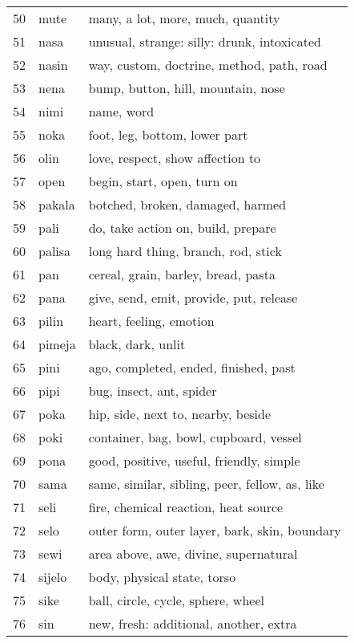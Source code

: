\documentclass[11pt]{article}
\begin{document}
{\begin{multicols}{2}[]
\columnbreak
\begin{center}
\begin{tabularx}{\linewidth}{rlX}
50 & mute & many, a lot, more, much, quantity\\[0pt]
51 & nasa & unusual, strange: silly: drunk, intoxicated\\[0pt]
52 & nasin & way, custom, doctrine, method, path, road\\[0pt]
53 & nena & bump, button, hill, mountain, nose\\[0pt]
54 & nimi & name, word\\[0pt]
55 & noka & foot, leg, bottom, lower part\\[0pt]
56 & olin & love, respect, show affection to\\[0pt]
57 & open & begin, start, open, turn on\\[0pt]
58 & pakala & botched, broken, damaged, harmed\\[0pt]
59 & pali & do, take action on, build, prepare\\[0pt]
60 & palisa & long hard thing, branch, rod, stick\\[0pt]
61 & pan & cereal, grain, barley, bread, pasta\\[0pt]
62 & pana & give, send, emit, provide, put, release\\[0pt]
63 & pilin & heart, feeling, emotion\\[0pt]
64 & pimeja & black, dark, unlit\\[0pt]
65 & pini & ago, completed, ended, finished, past\\[0pt]
66 & pipi & bug, insect, ant, spider\\[0pt]
67 & poka & hip, side, next to, nearby, beside\\[0pt]
68 & poki & container, bag, bowl, cupboard, vessel\\[0pt]
69 & pona & good, positive, useful, friendly, simple\\[0pt]
70 & sama & same, similar, sibling, peer, fellow, as, like\\[0pt]
71 & seli & fire, chemical reaction, heat source\\[0pt]
72 & selo & outer form, outer layer, bark, skin, boundary\\[0pt]
73 & sewi & area above, awe, divine, supernatural\\[0pt]
74 & sijelo & body, physical state, torso\\[0pt]
75 & sike & ball, circle, cycle, sphere, wheel\\[0pt]
76 & sin & new, fresh: additional, another, extra\\[0pt]

\end{tabularx}
\end{center}
\end{multicols}}
\end{document}
